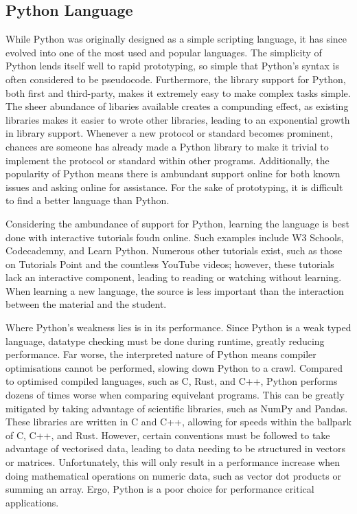 \documentclass[11pt]{article}
\begin{document}
\subsection{Python Language}

While Python was originally designed as a simple scripting language, it has since evolved into one of the most used and popular languages. The simplicity of Python lends itself well to rapid prototyping, so simple that Python's syntax is often considered to be pseudocode. Furthermore, the library support for Python, both first and third-party, makes it extremely easy to make complex tasks simple. The sheer abundance of libaries available creates a compunding effect, as existing libraries makes it easier to wrote other libraries, leading to an exponential growth in library support. Whenever a new protocol or standard becomes prominent, chances are someone has already made a Python library to make it trivial to implement the protocol or standard within other programs. Additionally, the popularity of Python means there is ambundant support online for both known issues and asking online for assistance. For the sake of prototyping, it is difficult to find a better language than Python.

Considering the ambundance of support for Python, learning the language is best done with interactive tutorials foudn online. Such examples include W3 Schools, Codecademny, and Learn Python. Numerous other tutorials exist, such as those on Tutorials Point and the countless YouTube videos; however, these tutorials lack an interactive component, leading to reading or watching without learning. When learning a new language, the source is less important than the interaction between the material and the student.

Where Python's weakness lies is in its performance. Since Python is a weak typed language, datatype checking must be done during runtime, greatly reducing performance. Far worse, the interpreted nature of Python means compiler optimisations cannot be performed, slowing down Python to a crawl. Compared to optimised compiled languages, such as C, Rust, and C++, Python performs dozens of times worse when comparing equivelant programs. This can be greatly mitigated by taking advantage of scientific libraries, such as NumPy and Pandas. These libraries are written in C and C++, allowing for speeds within the ballpark of C, C++, and Rust. However, certain conventions must be followed to take advantage of vectorised data, leading to data needing to be structured in vectors or matrices. Unfortunately, this will only result in a performance increase when doing mathematical operations on numeric data, such as vector dot products or summing an array. Ergo, Python is a poor choice for performance critical applications.
\end{document}
